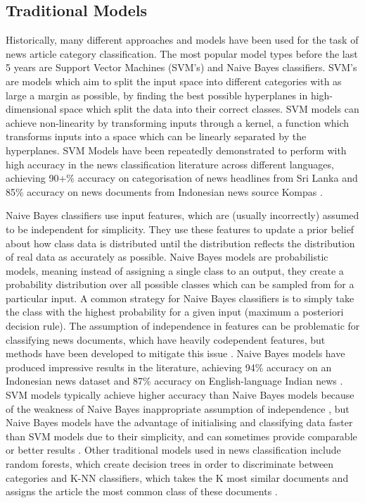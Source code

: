 \documentclass{l4proj}
\begin{document}
\subsection{Traditional Models}
Historically, many different approaches and models have been used for the task of news article category classification. The most popular model types before the last 5 years are Support Vector Machines (SVM's) and Naive Bayes classifiers. SVM's are models which aim to split the input space into different categories with as large a margin as possible, by finding the best possible hyperplanes in high-dimensional space which split the data into their correct classes. SVM models can achieve non-linearity by transforming inputs through a kernel, a function which transforms inputs into a space which can be linearly separated by the hyperplanes. SVM Models have been repeatedly demonstrated to perform with high accuracy in the news classification literature across different languages, achieving 90+\% accuracy on categorisation of news headlines from Sri Lanka \citep{dilrukshi2013twitter} and 85\% accuracy on news documents from Indonesian news source Kompas \citep{liliana2011indonesian}. \par
Naive Bayes classifiers use input features, which are (usually incorrectly) assumed to be independent for simplicity. They use these features to update a prior belief about how class data is distributed until the distribution reflects the distribution of real data as accurately as possible. Naive Bayes models are probabilistic models, meaning instead of assigning a single class to an output, they create a probability distribution over all possible classes which can be sampled from for a particular input. A common strategy for Naive Bayes classifiers is to simply take the class with the highest probability for a given input (maximum a posteriori decision rule). The assumption of independence in features can be problematic for classifying news documents, which have heavily codependent features, but methods have been developed to mitigate this issue \citep{qiang2010effective}. Naive Bayes models have produced impressive results in the literature, achieving 94\% accuracy on an Indonesian news dataset \citep{septian2017indonesian} and 87\% accuracy on English-language Indian news \citep{kumar2022intelligent}.
SVM models typically achieve higher accuracy than Naive Bayes models because of the weakness of Naive Bayes inappropriate assumption of independence \citep{dilrukshi2013twitter2, shahi2018nepali, fanny2018comparison}, but Naive Bayes models have the advantage of initialising and classifying data faster than SVM models due to their simplicity, and can sometimes provide comparable or better results \citep{ting2011naive}. Other traditional models used in news classification include random forests, which create decision trees in order to discriminate between categories \citep{liparas2014news} and K-NN classifiers, which takes the K most similar documents and assigns the article the most common class of these documents \citep{chen2020lao}.
\end{document}

